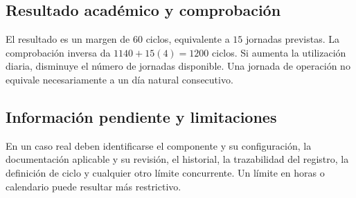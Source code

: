 \subsection{Resultado académico y comprobación}
El resultado es un margen de $60$ ciclos, equivalente a $15$ jornadas previstas. La comprobación inversa da $1140+15(4)=1200$ ciclos. Si aumenta la utilización diaria, disminuye el número de jornadas disponible. Una jornada de operación no equivale necesariamente a un día natural consecutivo.

\subsection{Información pendiente y limitaciones}
En un caso real deben identificarse el componente y su configuración, la documentación aplicable y su revisión, el historial, la trazabilidad del registro, la definición de ciclo y cualquier otro límite concurrente. Un límite en horas o calendario puede resultar más restrictivo.

